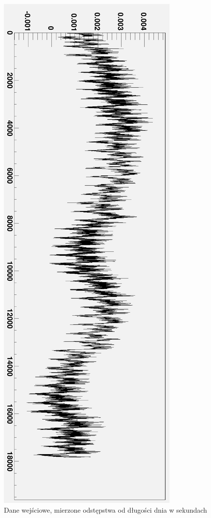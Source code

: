 \documentclass[12pt,a4]{article}
\begin{document}
\begin{figure}[htbp]
  \includegraphics[height=\textheight]{doc/img/lod_g.eps} %
  \caption{Dane wejściowe, mierzone odstępstwa od długości dnia w sekundach}
  \label{fig:lod_g}
\end{figure}
\end{document}
